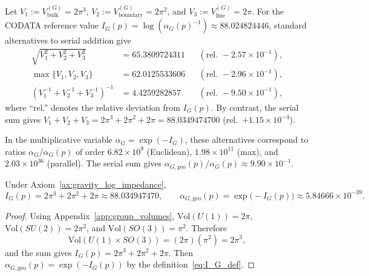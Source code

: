 \begin{remark}\label{rem:IG_aggregation_isolation}
Let $V_1:=V^{(G)}_{\mathrm{bulk}}=2\pi^3$, $V_2:=V^{(G)}_{\mathrm{boundary}}=2\pi^2$, and $V_3:=V^{(G)}_{\mathrm{line}}=2\pi$. For the CODATA reference value $I_G(p)=\log(\alpha_G(p)^{-1})\approx 88.024824446$, standard alternatives to serial addition give
\begin{equation}
\begin{aligned}
\sqrt{V_1^2+V_2^2+V_3^2} &= 65.3809724311 &&(\text{rel.\ }-2.57\times 10^{-1}),\\
\max\{V_1,V_2,V_3\} &= 62.0125533606 &&(\text{rel.\ }-2.96\times 10^{-1}),\\
(V_1^{-1}+V_2^{-1}+V_3^{-1})^{-1} &= 4.4259282857 &&(\text{rel.\ }-9.50\times 10^{-1}),
\end{aligned}
\end{equation}
where ``rel.'' denotes the relative deviation from $I_G(p)$. By contrast, the serial sum gives $V_1+V_2+V_3=2\pi^3+2\pi^2+2\pi=88.0349474700$ (rel.\ $+1.15\times 10^{-4}$).

In the multiplicative variable $\alpha_G=\exp(-I_G)$, these alternatives correspond to ratios $\alpha_G/\allowbreak \alpha_G(p)$ of order $6.82\times 10^{9}$ (Euclidean), $1.98\times 10^{11}$ (max), and $2.03\times 10^{36}$ (parallel). The serial sum gives $\alpha_{G,\mathrm{geo}}(p)/\allowbreak \alpha_G(p)\approx 9.90\times 10^{-1}$.
\end{remark}

\begin{theorem}\label{thm:alpha_G_proton}
Under Axiom~\ref{ax:gravity_log_impedance},
\begin{equation}
I_G(p)=2\pi^3+2\pi^2+2\pi\approx 88.034947470,
\qquad
\alpha_{G,\mathrm{geo}}(p)=\exp\!\big(-I_G(p)\big)\approx 5.84666\times 10^{-39}.
\end{equation}
\end{theorem}
\begin{proof}
Using Appendix~\ref{app:group_volumes}, $\mathrm{Vol}(U(1))=2\pi$, $\mathrm{Vol}(SU(2))=2\pi^2$, and $\mathrm{Vol}(SO(3))=\pi^2$. Therefore
\begin{equation}
\mathrm{Vol}(U(1)\times SO(3))=(2\pi)(\pi^2)=2\pi^3,
\end{equation}
and the sum gives $I_G(p)=2\pi^3+2\pi^2+2\pi$. Then $\alpha_{G,\mathrm{geo}}(p)=\exp(-I_G(p))$ by the definition~\eqref{eq:I_G_def}.
\end{proof}

